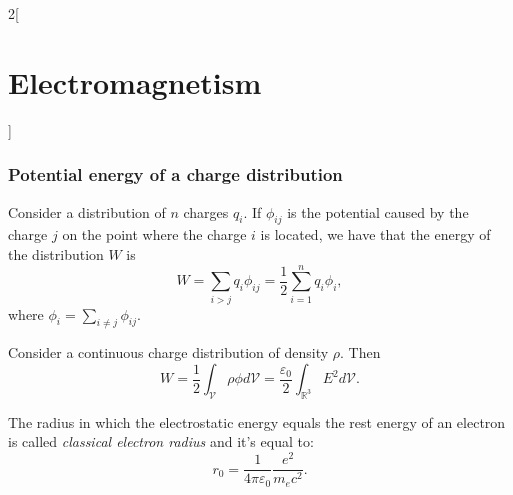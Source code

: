 \documentclass[../../../main.tex]{subfiles}
\begin{document}
\begin{multicols}{2}[\section{Electromagnetism}]
    \subsubsection*{Potential energy of a charge distribution}
    \begin{concept}
        Consider a distribution of $n$ charges $q_i$. If $\phi_{ij}$ is the potential caused by the charge $j$ on the point where the charge $i$ is located, we have that the energy of the distribution $W$ is $$W=\sum_{i>j}q_i\phi_{ij}=\frac{1}{2}\sum_{i=1}^nq_i\phi_i,$$ where $\displaystyle\phi_i=\sum_{i\ne j}\phi_{ij}$.
    \end{concept}
    \begin{concept}
        Consider a continuous charge distribution of density $\rho$. Then $$W=\frac{1}{2}\int_\mathcal{V}\rho\phi d\mathcal{V}=\frac{\varepsilon_0}{2}\int_{\mathbb{R}^3}E^2d\mathcal{V}.$$
    \end{concept}
    \begin{definition}
        The radius in which the electrostatic energy equals the rest energy of an electron is called \textit{classical electron radius} and it's equal to: $$r_0=\frac{1}{4\pi\varepsilon_0}\frac{e^2}{m_ec^2}.$$
    \end{definition}
\end{multicols}
\end{document}
